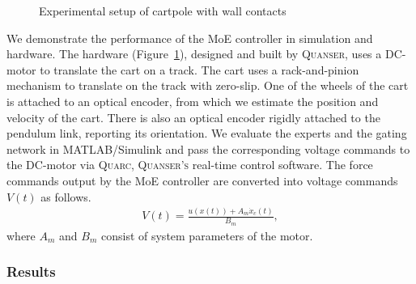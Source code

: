 \begin{figure}[tb]
    \centering
    \caption{Experimental setup of cartpole with wall contacts}
    \label{fig:cartpole_hardware}
\end{figure}
%
We demonstrate the performance of the MoE controller in simulation and hardware. 
%
The hardware (Figure~\ref{fig:cartpole_hardware}), designed and built by
\textsc{Quanser}\cite{Quanser_2021}, uses a DC-motor to translate the cart on a
track.
% 
The cart uses a rack-and-pinion mechanism to translate on the track with
zero-slip.
%
One of the wheels of the cart is attached to an optical encoder, from which we
estimate the position and velocity of the cart.
%
There is also an optical encoder rigidly attached to the pendulum link,
reporting its orientation. 
%
%
We evaluate the experts and the gating network in MATLAB/Simulink and pass the
corresponding voltage commands to the DC-motor via \textsc{Quarc},
\textsc{Quanser's} real-time control software.
%
The force commands output by the MoE controller are converted into voltage
commands $V(t)$ as follows.
\begin{align*}
    V(t) = \frac{u(x(t)) + A_m \dot{x}_c(t)}{B_m},
\end{align*} 
\noindent where $A_m$ and $B_m$ consist of system parameters of the motor.


\subsubsection{Results}

